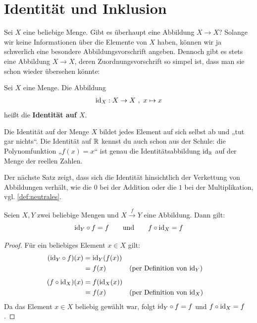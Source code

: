 \section{Identität und Inklusion}


Sei $X$ eine beliebige Menge. Gibt es überhaupt eine Abbildung $X\to X$? Solange wir keine Informationen über die Elemente von $X$ haben, können wir ja schwerlich eine besondere Abbildungsvorschrift angeben. Dennoch gibt es stets eine Abbildung $X\to X$, deren Zuordnungsvorschrift so simpel ist, dass man sie schon wieder übersehen könnte:


\begin{defin}[Identitätsabbildung] 
    Sei $X$ eine Menge. Die Abbildung
    \begin{align*}
        \mathrm{id}_X: X \to X \ ,\ x \mapsto x
    \end{align*}
    heißt die \textbf{Identität auf $X$}.
\end{defin}


\begin{bem}
    Die Identität auf der Menge $X$ bildet jedes Element auf sich selbst ab und „tut gar nichts“. Die Identität auf $\mathbb R$ kennst du auch schon aus der Schule: die Polynomfunktion „$f(x)=x$“ ist genau die Identitätsabbildung $\mathrm{id}_\mathbb R$ auf der Menge der reellen Zahlen.
\end{bem}


\noindent Der nächste Satz zeigt, dass sich die Identität hinsichtlich der Verkettung von Abbildungen verhält, wie die $0$ bei der Addition oder die $1$ bei der Multiplikation, vgl. \cref{def:neutrales}.


\begin{satz} \label{idneutral}
    Seien $X,Y$ zwei beliebige Mengen und $X\xrightarrow{f} Y$ eine Abbildung. Dann gilt:
        \[ \mathrm{id}_Y \circ f = f \qquad\textnormal{und}\qquad f\circ \mathrm{id}_X = f \]
\end{satz}
\begin{proof}
    Für ein beliebiges Element $x \in X$ gilt:
    \begin{align*}
        (\mathrm{id}_Y \circ f)(x) & =\mathrm{id}_Y(f(x)) \\
        & = f(x)&& (\text{per Definition von $\mathrm{id}_Y$}) \\[0.5em]
        (f\circ \mathrm{id}_X)(x) & = f(\mathrm{id}_X(x)) \\
        & =f(x) && (\text{per Definition von $\mathrm{id}_X$})
    \end{align*}
    Da das Element $x\in X$ beliebig gewählt war, folgt $\mathrm{id}_Y\circ f=f$ und $f\circ \mathrm{id}_X=f$.
\end{proof}


